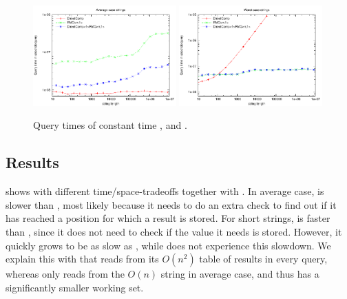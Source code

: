 \documentclass[a4]{article}
\newcommand*{\pref}{\prettyref}
\begin{document}
\begin{figure}[tp]
    \begin{center}
        \includegraphics[width=0.49\textwidth,type=pdf,ext=.pdf,read=.pdf]{../src/results/length-rmq-directcomp-rand10.plt}
        \includegraphics[width=0.49\textwidth,type=pdf,ext=.pdf,read=.pdf]{../src/results/length-rmq-directcomp-alla.plt}
    \end{center}
    \caption{\label{fig:plot-rmq-directcomp}Query times of constant time ,  and .}
\end{figure}

\subsection{ Results}

\pref{fig:plot-complookup} shows  with different time/space-tradeoffs together with . In average case,  is slower than , most likely because it needs to do an extra check to find out if it has reached a position for which a result is stored. For short strings,  is faster than , since it does not need to check if the value it needs is stored. However, it quickly grows to be as slow as , while  does not experience this slowdown. We explain this with that  reads from its $O(n^2)$ table of results in every query, whereas  only reads from the $O(n)$ string in average case, and thus has a significantly smaller working set.
\end{document}

